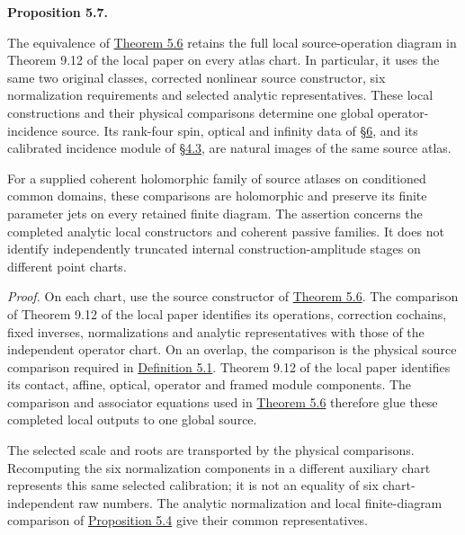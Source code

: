 \documentclass[
  english,
  11pt,
  reqno]{amsart}
\makeatletter
\newcommand{\pandocstatementheading}[1]{%
  \par\addpenalty{\@beginparpenalty}%
  \addvspace{.5\baselineskip plus .2\baselineskip minus .2\baselineskip}%
  {\normalfont\bfseries #1\par}%
  \nobreak\@afterindenttrue\@afterheading
}
\makeatother
\begin{document}
\pandocstatementheading{\protect{}\label{prop:source-atlas-complete-diagram}Proposition 5.7.}

The equivalence of
\hyperref[thm:original-source-atlas-operator-equivalence]{Theorem 5.6}
retains the full local source-operation diagram in Theorem 9.12 of the
local paper on every atlas chart. In particular, it uses the same two
original classes, corrected nonlinear source constructor, six
normalization requirements and selected analytic representatives. These
local constructions and their physical comparisons determine one global
operator-incidence source. Its rank-four spin, optical and infinity data
of \hyperref[sec:spin-reality-v08]{§6}, and its calibrated incidence
module of \hyperref[sec:operator-parametrized-incidence-v08]{§4.3}, are
natural images of the same source atlas.

For a supplied coherent holomorphic family of source atlases on
conditioned common domains, these comparisons are holomorphic and
preserve its finite parameter jets on every retained finite diagram. The
assertion concerns the completed analytic local constructors and
coherent passive families. It does not identify independently truncated
internal construction-amplitude stages on different point charts.

\emph{Proof.} On each chart, use the source constructor of
\hyperref[thm:original-source-atlas-operator-equivalence]{Theorem 5.6}.
The comparison of Theorem 9.12 of the local paper identifies its
operations, correction cochains, fixed inverses, normalizations and
analytic representatives with those of the independent operator chart.
On an overlap, the comparison is the physical source comparison required
in \hyperref[def:independent-original-source-atlas]{Definition 5.1}.
Theorem 9.12 of the local paper identifies its contact, affine, optical,
operator and framed module components. The comparison and associator
equations used in
\hyperref[thm:original-source-atlas-operator-equivalence]{Theorem 5.6}
therefore glue these completed local outputs to one global source.

The selected scale and roots are transported by the physical
comparisons. Recomputing the six normalization components in a different
auxiliary chart represents this same selected calibration; it is not an
equality of six chart-independent raw numbers. The analytic
normalization and local finite-diagram comparison of
\hyperref[prop:source-atlas-local-analytic-execution]{Proposition 5.4}
give their common representatives.
\end{document}
